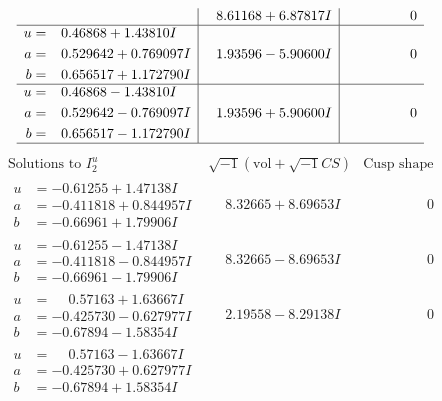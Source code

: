 \documentclass[1p]{elsarticle_modified}
\theoremstyle{definition}
\newcommand{\I}{\sqrt{-1}}
\begin{document}
$$\begin{array}{c|c|c}
 & \phantom{-}8.61168 + 6.87817 I & \phantom{-0.000000 } 0 \\ \hline\begin{aligned}
u &= \phantom{-}0.46868 + 1.43810 I \\
a &= \phantom{-}0.529642 + 0.769097 I \\
b &= \phantom{-}0.656517 + 1.172790 I\end{aligned}
 & \phantom{-}1.93596 - 5.90600 I & \phantom{-0.000000 } 0 \\ \hline\begin{aligned}
u &= \phantom{-}0.46868 - 1.43810 I \\
a &= \phantom{-}0.529642 - 0.769097 I \\
b &= \phantom{-}0.656517 - 1.172790 I\end{aligned}
 & \phantom{-}1.93596 + 5.90600 I & \phantom{-0.000000 } 0\\
 \hline 
 \end{array}$$\newpage$$\begin{array}{c|c|c}  
\text{Solutions to }I^u_{2}& \I (\text{vol} + \sqrt{-1}CS) & \text{Cusp shape}\\
 \hline 
\begin{aligned}
u &= -0.61255 + 1.47138 I \\
a &= -0.411818 + 0.844957 I \\
b &= -0.66961 + 1.79906 I\end{aligned}
 & \phantom{-}8.32665 + 8.69653 I & \phantom{-0.000000 } 0 \\ \hline\begin{aligned}
u &= -0.61255 - 1.47138 I \\
a &= -0.411818 - 0.844957 I \\
b &= -0.66961 - 1.79906 I\end{aligned}
 & \phantom{-}8.32665 - 8.69653 I & \phantom{-0.000000 } 0 \\ \hline\begin{aligned}
u &= \phantom{-}0.57163 + 1.63667 I \\
a &= -0.425730 - 0.627977 I \\
b &= -0.67894 - 1.58354 I\end{aligned}
 & \phantom{-}2.19558 - 8.29138 I & \phantom{-0.000000 } 0 \\ \hline\begin{aligned}
u &= \phantom{-}0.57163 - 1.63667 I \\
a &= -0.425730 + 0.627977 I \\
b &= -0.67894 + 1.58354 I\end{aligned}

\end{array}$$
\end{document}
